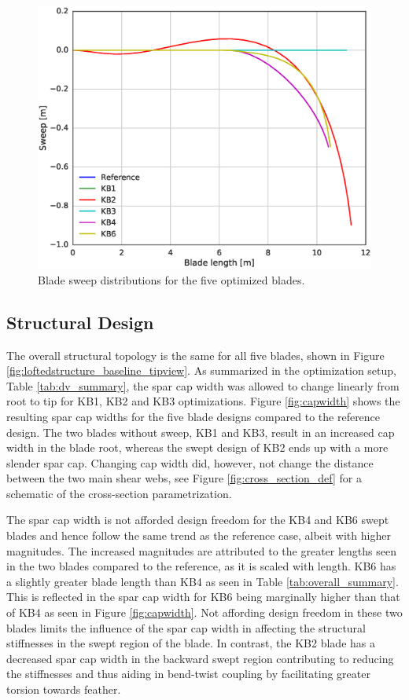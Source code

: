 \begin{figure}[!ht]
\begin{center}
	\includegraphics[width=.85\linewidth]{figures/KBcomp_sweep.eps}
\end{center}
\caption{Blade sweep distributions for the five optimized blades.}
\label{fig:sweep}
\end{figure}

\subsection{Structural Design}

The overall structural topology is the same for all five blades, shown in Figure \ref{fig:loftedstructure_baseline_tipview}.
As summarized in the optimization setup, Table \ref{tab:dv_summary}, the spar cap width was allowed to change linearly from root to tip for KB1, KB2 and KB3 optimizations. Figure \ref{fig:capwidth} shows the resulting spar cap widths for the five blade designs compared to the reference design.
The two blades without sweep, KB1 and KB3, result in an increased cap width in the blade root, whereas the swept design of KB2 ends up with a more slender spar cap. Changing cap width did, however, not change the distance between the two main shear webs, see Figure \ref{fig:cross_section_def} for a schematic of the cross-section parametrization.

The spar cap width is not afforded design freedom for the KB4 and KB6 swept blades and hence follow the same trend as the reference case, albeit with higher magnitudes. The increased magnitudes are attributed to the greater lengths seen in the two blades compared to the reference, as it is scaled with length. KB6 has a slightly greater blade length than KB4 as seen in Table \ref{tab:overall_summary}. This is reflected in the spar cap width for KB6 being marginally higher than that of KB4 as seen in Figure \ref{fig:capwidth}. Not affording design freedom in these two blades limits the influence of the spar cap width in affecting the structural stiffnesses in the swept region of the blade. In contrast, the KB2 blade has a decreased spar cap width in the backward swept region contributing to reducing the stiffnesses and thus aiding in bend-twist coupling by facilitating greater torsion towards feather. 

